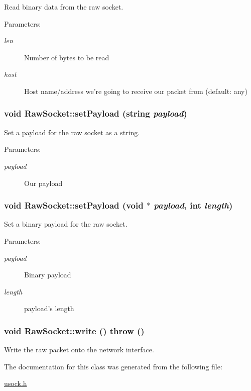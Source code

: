 Read binary data from the raw socket. 

\begin{Desc}
\item[Parameters:]
\begin{description}
\item[{\em len}]Number of bytes to be read \item[{\em host}]Host name/address we're going to receive our packet from (default: any) \end{description}
\end{Desc}
\hypertarget{classRawSocket_a987d5f171d49fab97e1b3d6f56b4bb4}{
\subsubsection[{setPayload}]{\setlength{\rightskip}{0pt plus 5cm}void RawSocket::setPayload (string {\em payload})}}
\label{classRawSocket_a987d5f171d49fab97e1b3d6f56b4bb4}


Set a payload for the raw socket as a string. 

\begin{Desc}
\item[Parameters:]
\begin{description}
\item[{\em payload}]Our payload \end{description}
\end{Desc}
\hypertarget{classRawSocket_4969ba6947943aed82dc3cebb5c0f708}{
\subsubsection[{setPayload}]{\setlength{\rightskip}{0pt plus 5cm}void RawSocket::setPayload (void $\ast$ {\em payload}, \/  int {\em length})}}
\label{classRawSocket_4969ba6947943aed82dc3cebb5c0f708}


Set a binary payload for the raw socket. 

\begin{Desc}
\item[Parameters:]
\begin{description}
\item[{\em payload}]Binary payload \item[{\em length}]payload's length \end{description}
\end{Desc}
\hypertarget{classRawSocket_149999a5d231c93e206be89eec9732b8}{
\subsubsection[{write}]{\setlength{\rightskip}{0pt plus 5cm}void RawSocket::write ()  throw ()}}
\label{classRawSocket_149999a5d231c93e206be89eec9732b8}


Write the raw packet onto the network interface. 



The documentation for this class was generated from the following file:\begin{CompactItemize}
\item 
\hyperlink{usock_8h}{usock.h}\end{CompactItemize}
